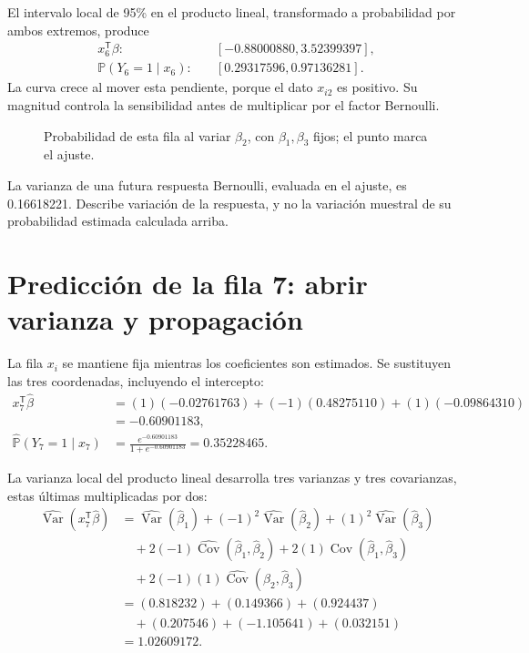 \documentclass[11pt,a4paper]{article}
\newcommand{\Prob}{\mathbb P}
\newcommand{\T}{^{\mathsf T}}
\DeclareMathOperator{\Var}{Var}
\DeclareMathOperator{\Cov}{Cov}
\begin{document}
El intervalo local de 95\% en el producto lineal,
transformado a probabilidad por ambos extremos, produce
\[
\begin{aligned}
x_{6}\T\beta:&\quad[-0.88000880,3.52399397],\\\Prob(Y_{6}=1\mid x_{6}):&\quad[0.29317596,0.97136281].\end{aligned}
\]
La curva crece al mover esta pendiente, porque el dato $x_{i2}$ es positivo. Su magnitud controla la sensibilidad antes de multiplicar por el factor Bernoulli.
\begin{figure}[H]\centering
{}
\caption{Probabilidad de esta fila al variar \(\beta_2\), con \(\beta_1,\beta_3\) fijos; el punto marca el ajuste.}
\end{figure}

La varianza de una futura respuesta Bernoulli,
evaluada en el ajuste, es 0.16618221.
Describe variación de la respuesta, y no la variación
muestral de su probabilidad estimada calculada arriba.
\endgroup

\clearpage
\section{Predicción de la fila 7: abrir varianza y propagación}\label{logit116}
\begingroup\small
\setlength{\abovedisplayskip}{4pt}\setlength{\belowdisplayskip}{4pt}
La fila \(x_i\) se mantiene fija mientras los coeficientes
son estimados. Se sustituyen las tres coordenadas,
incluyendo el intercepto:
\[
\begin{aligned}
x_{7}\T\widehat\beta&=(1)(-0.02761763)+(-1)(0.48275110)+(1)(-0.09864310)\\&=-0.60901183,\\\widehat{\Prob}(Y_{7}=1\mid x_{7})&=\frac{e^{-0.60901183}}{1+e^{-0.60901183}}=0.35228465.\end{aligned}
\]

La varianza local del producto lineal desarrolla tres varianzas
y tres covarianzas, estas últimas multiplicadas por dos:
\[
\begin{aligned}
\widehat{\Var}(x_{7}\T\widehat\beta)&=\widehat{\Var}(\widehat\beta_1)+(-1)^2\widehat{\Var}(\widehat\beta_2)+(1)^2\widehat{\Var}(\widehat\beta_3)\\&\quad+2(-1)\widehat{\Cov}(\widehat\beta_1,\widehat\beta_2)+2(1)\widehat{\Cov}(\widehat\beta_1,\widehat\beta_3)\\&\quad+2(-1)(1)\widehat{\Cov}(\widehat\beta_2,\widehat\beta_3)\\&=(0.818232)+(0.149366)+(0.924437)\\&\quad+(0.207546)+(-1.105641)+(0.032151)\\&=1.02609172.\end{aligned}
\]
\end{document}
